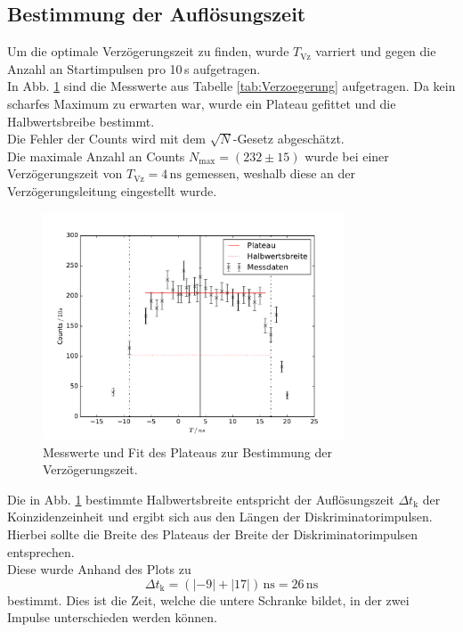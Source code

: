 \subsection{Bestimmung der Auflösungszeit}
Um die optimale Verzögerungszeit zu finden, wurde  $T_\text{Vz}$ varriert und gegen die Anzahl an Startimpulsen pro 10\,s aufgetragen.\\
In Abb. \ref{fig:Verzoegerung} sind die Messwerte aus Tabelle \ref{tab:Verzoegerung} aufgetragen. Da kein scharfes Maximum zu erwarten war,
wurde ein Plateau gefittet und die Halbwertsbreibe bestimmt.\\
Die Fehler der Counts wird mit dem $\sqrt{N}$-Gesetz abgeschätzt.\\
Die maximale Anzahl an Counts $N_{\text{max}}=(232\pm15)$ wurde bei einer Verzögerungszeit von $T_\text{Vz}=4\,\text{ns}$ gemessen, weshalb diese
an der Verzögerungsleitung eingestellt wurde.
\begin{figure}
  \centering
  \includegraphics[width=0.8\textwidth]{plots/plotVerzoegerung.pdf}
  \caption{Messwerte und Fit des Plateaus zur Bestimmung der Verzögerungszeit.}
  \label{fig:Verzoegerung}
\end{figure}
Die in Abb. \ref{fig:Verzoegerung} bestimmte Halbwertsbreite entspricht der Auflösungszeit $\Delta t_{\text{k}}$
der Koinzidenzeinheit und ergibt sich aus den Längen der Diskriminatorimpulsen.
Hierbei sollte die Breite des Plateaus der Breite der Diskriminatorimpulsen entsprechen.\\
Diese wurde Anhand
des Plots zu
\begin{equation*}
  \Delta t_{\text{k}}=(|-9|+|17|)\,\text{ns}=26\,\text{ns}
\end{equation*}
bestimmt.
Dies ist die Zeit, welche die untere Schranke bildet, in der zwei Impulse unterschieden werden können.\\

